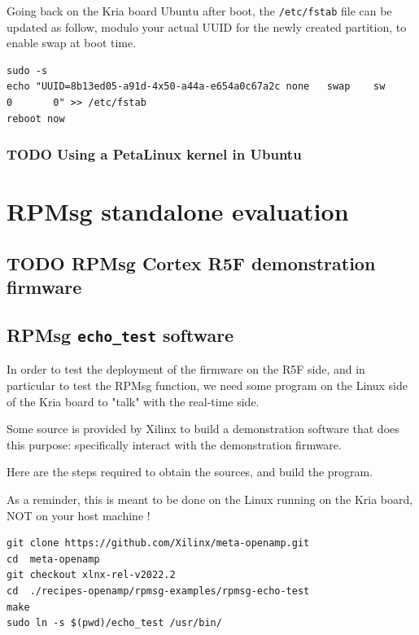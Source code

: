 \documentclass[10pt]{article}
\begin{document}
Going back on the Kria board Ubuntu after boot, the \texttt{/etc/fstab} file can be
updated as follow, modulo your actual UUID for the newly created partition, to
enable swap at boot time.
\begin{verbatim}
sudo -s
echo "UUID=8b13ed05-a91d-4x50-a44a-e654a0c67a2c none   swap    sw      0       0" >> /etc/fstab
reboot now
\end{verbatim}

\subsubsection{{\bfseries\sffamily TODO} Using a PetaLinux kernel in Ubuntu}
\label{sec:org24ea273}
\clearpage
\section{RPMsg standalone evaluation}
\label{sec:orgc4ad07f}
\subsection{{\bfseries\sffamily TODO} RPMsg Cortex R5F demonstration firmware}
\label{sec:org51ff595}
\subsection{RPMsg \texttt{echo\_test} software}
\label{sec:orgdde3900}
In order to test the deployment of the firmware on the R5F side, and in particular
to test the RPMsg function, we need some program on the Linux side of the Kria
board to "talk" with the real-time side.

Some source is provided by Xilinx to build a demonstration software that does
this purpose: specifically interact with the demonstration firmware.

Here are the steps required to obtain the sources, and build the program.

As a reminder, this is meant to be done on the Linux running on the
Kria board, NOT on your host machine !

\begin{verbatim}
git clone https://github.com/Xilinx/meta-openamp.git
cd  meta-openamp
git checkout xlnx-rel-v2022.2
cd  ./recipes-openamp/rpmsg-examples/rpmsg-echo-test
make
sudo ln -s $(pwd)/echo_test /usr/bin/
\end{verbatim}
\end{document}
